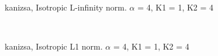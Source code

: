 \begin{figure}
  \centering
     \\
  \caption{kanizsa, Isotropic L-infinity norm. $\alpha$ = 4, K1 = 1, K2 = 4}
  \label{fig:kanizsa_LINF_a4_k11_k24}
\end{figure}

\begin{figure}
  \centering
     \\
  \caption{kanizsa, Isotropic L1 norm. $\alpha$ = 4, K1 = 1, K2 = 4}
  \label{fig:kanizsa_L1_a4_k11_k24}
\end{figure}

